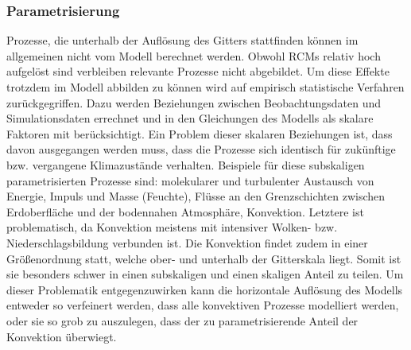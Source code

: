 \subsubsection{Parametrisierung} \label{sec:parametrisierung}
Prozesse, die unterhalb der Auflösung des Gitters stattfinden können im allgemeinen nicht vom Modell berechnet werden. Obwohl RCMs relativ hoch aufgelöst sind verbleiben relevante Prozesse nicht abgebildet. Um diese Effekte trotzdem im Modell abbilden zu können wird auf empirisch statistische Verfahren zurückgegriffen. Dazu werden Beziehungen zwischen Beobachtungsdaten und Simulationsdaten errechnet und in den Gleichungen des Modells als skalare Faktoren mit berücksichtigt. Ein Problem dieser skalaren Beziehungen ist, dass davon ausgegangen werden muss, dass die Prozesse sich identisch für zukünftige bzw. vergangene Klimazustände verhalten. Beispiele für diese subskaligen parametrisierten Prozesse sind: molekularer und turbulenter Austausch von Energie, Impuls und Masse (Feuchte), Flüsse an den Grenzschichten zwischen Erdoberfläche und der bodennahen Atmosphäre, Konvektion. Letztere ist problematisch, da Konvektion meistens mit intensiver Wolken- bzw. Niederschlagsbildung verbunden ist. Die Konvektion findet zudem in einer Größenordnung statt, welche ober- und unterhalb der Gitterskala liegt. Somit ist sie besonders schwer in einen subskaligen und einen skaligen Anteil zu teilen. Um dieser Problematik entgegenzuwirken kann die horizontale Auflösung des Modells entweder so verfeinert werden, dass alle konvektiven Prozesse modelliert werden, oder sie so grob zu auszulegen, dass der zu parametrisierende Anteil der Konvektion überwiegt.
